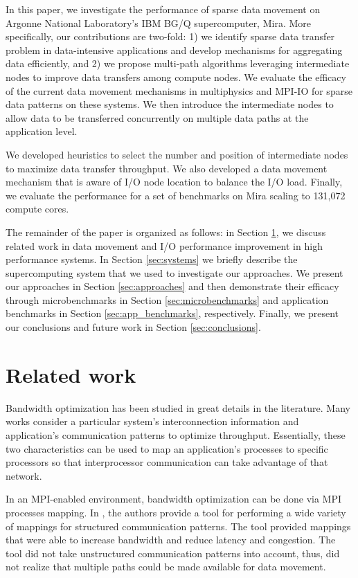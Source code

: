 \documentclass[final,5p,times]{elsarticle}
\begin{document}
In this paper, we investigate the performance of sparse data movement on Argonne National Laboratory's IBM BG/Q supercomputer, Mira. More specifically, our contributions are two-fold: 1) we identify sparse data transfer problem in data-intensive applications and develop mechanisms for aggregating data efficiently, and 2) we propose multi-path algorithms leveraging intermediate nodes to improve data transfers among compute nodes. We evaluate the efficacy of the current data movement mechanisms in multiphysics and MPI-IO for sparse data patterns on these systems. We then introduce the intermediate nodes to allow data to be transferred concurrently on multiple data paths at the application level.

We developed heuristics to select the number and position of intermediate nodes to maximize data transfer throughput. We also developed a data movement mechanism that is aware of I/O node location to balance the I/O load. Finally, we evaluate the performance for a set of benchmarks on Mira scaling to 131,072 compute cores.

The remainder of the paper is organized as follows: in Section \ref{sec:relatedwork}, we discuss related work in data movement and I/O performance improvement in high performance systems. In Section \ref{sec:systems} we briefly describe the supercomputing system that we used to investigate our approaches. We present our approaches in Section \ref{sec:approaches} and then demonstrate their efficacy through microbenchmarks in Section \ref{sec:microbenchmarks} and application benchmarks in Section \ref{sec:app_benchmarks}, respectively. Finally, we present our conclusions and future work in Section \ref{sec:conclusions}.

\section{Related work}
\label{sec:relatedwork}

Bandwidth optimization has been studied in great details in the literature. Many works consider a particular system's interconnection information and application's communication patterns to optimize throughput. Essentially, these two characteristics can be used to map an application's processes to specific processors so that interprocessor communication can take advantage of that network.

In an MPI-enabled environment, bandwidth optimization can be done via MPI processes mapping. In \cite{Bhatele:mapping}, the authors provide a tool for performing a wide variety of mappings for structured communication patterns. The tool provided mappings that were able to increase bandwidth and reduce latency and congestion. The tool did not take unstructured communication patterns into account, thus, did not realize that multiple paths could be made available for data movement.
\end{document}
